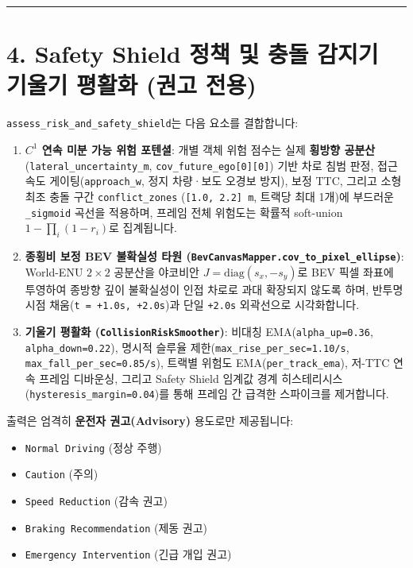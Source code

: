 \documentclass[10.5pt,a4paper]{article}
\begin{document}
\par\noindent\rule{\textwidth}{0.4pt}\par\medskip

\section{4. Safety Shield 정책 및 충돌 감지기 기울기 평활화 (권고 전용)}

\texttt{assess\_\allowbreak{}risk\_\allowbreak{}and\_\allowbreak{}safety\_\allowbreak{}shield}는 다음 요소를 결합합니다:

\begin{enumerate}[leftmargin=1.8em,itemsep=2pt]
\item \textbf{$C^1$ 연속 미분 가능 위험 포텐셜}: 개별 객체 위험 점수는 실제 \textbf{횡방향 공분산}(\texttt{lateral\_\allowbreak{}uncertainty\_\allowbreak{}m}, \texttt{cov\_\allowbreak{}future\_\allowbreak{}ego[0][0]}) 기반 차로 침범 판정, 접근 속도 게이팅(\texttt{approach\_\allowbreak{}w}, 정지 차량·보도 오경보 방지), 보정 TTC, 그리고 소형 최조 충돌 구간 \texttt{conflict\_\allowbreak{}zones} (\texttt{[1.\allowbreak{}0,\allowbreak{} 2.\allowbreak{}2] m}, 트랙당 최대 1개)에 부드러운 \texttt{\_\allowbreak{}sigmoid} 곡선을 적용하며, 프레임 전체 위험도는 확률적 soft-union $1 - \prod_i (1 - r_i)$로 집계됩니다.
\item \textbf{종횡비 보정 BEV 불확실성 타원 (\texttt{BevCanvasMapper.\allowbreak{}cov\_\allowbreak{}to\_\allowbreak{}pixel\_\allowbreak{}ellipse})}: World-ENU $2\times 2$ 공분산을 야코비안 $J = \text{diag}(s_x, -s_y)$로 BEV 픽셀 좌표에 투영하여 종방향 깊이 불확실성이 인접 차로로 과대 확장되지 않도록 하며, 반투명 시점 채움(\texttt{t = +1.\allowbreak{}0s,\allowbreak{} +2.\allowbreak{}0s})과 단일 \texttt{+2.\allowbreak{}0s} 외곽선으로 시각화합니다.
\item \textbf{기울기 평활화 (\texttt{CollisionRiskSmoother})}: 비대칭 EMA(\texttt{alpha\_\allowbreak{}up=0.\allowbreak{}36}, \texttt{alpha\_\allowbreak{}down=0.\allowbreak{}22}), 명시적 슬루율 제한(\texttt{max\_\allowbreak{}rise\_\allowbreak{}per\_\allowbreak{}sec=1.\allowbreak{}10/\allowbreak{}s}, \texttt{max\_\allowbreak{}fall\_\allowbreak{}per\_\allowbreak{}sec=0.\allowbreak{}85/\allowbreak{}s}), 트랙별 위험도 EMA(\texttt{per\_\allowbreak{}track\_\allowbreak{}ema}), 저-TTC 연속 프레임 디바운싱, 그리고 Safety Shield 임계값 경계 히스테리시스(\texttt{hysteresis\_\allowbreak{}margin=0.\allowbreak{}04})를 통해 프레임 간 급격한 스파이크를 제거합니다.
\end{enumerate}

출력은 엄격히 \textbf{운전자 권고(Advisory)} 용도로만 제공됩니다:

\begin{itemize}[leftmargin=1.5em,itemsep=2pt]
\item \texttt{Normal Driving} (정상 주행)
\item \texttt{Caution} (주의)
\item \texttt{Speed Reduction} (감속 권고)
\item \texttt{Braking Recommendation} (제동 권고)
\item \texttt{Emergency Intervention} (긴급 개입 권고)
\end{itemize}
\end{document}
